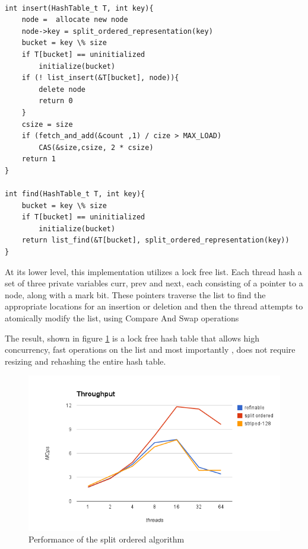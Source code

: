 \begin{lstlisting}

int insert(HashTable_t T, int key){
	node =  allocate new node
	node->key = split_ordered_representation(key)
	bucket = key \% size
	if T[bucket] == uninitialized
		initialize(bucket)
	if (! list_insert(&T[bucket], node)){
		delete node
		return 0
	}
	csize = size
	if (fetch_and_add(&count ,1) / cize > MAX_LOAD)
		CAS(&size,csize, 2 * csize)
	return 1
}

int find(HashTable_t T, int key){
	bucket = key \% size
	if T[bucket] == uninitialized
		initialize(bucket)
	return list_find(&T[bucket], split_ordered_representation(key))
}

\end{lstlisting}

At its lower level, this implementation utilizes a lock free list. Each thread hash a set of three private variables curr, prev and next, each consisting of a pointer to a node, along with a mark bit. These pointers traverse the list to find the appropriate locations for an insertion or deletion and then the thread attempts to atomically modify the list, using Compare And Swap operations

The result, shown in figure \ref{hashes_split_ordered_perf} is a lock free hash table that allows high concurrency, fast operations on the list and most importantly , does not require resizing and rehashing the entire hash table.

\begin{figure}
 \centering
  \includegraphics[scale=0.7]{hashes_split_ordered_perf.png}
\caption{Performance of the split ordered algorithm}
\label{hashes_split_ordered_perf}
\end{figure}

